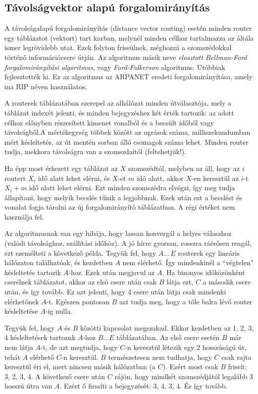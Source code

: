 \documentclass[fleqn,10pt,a4paper]{article}
\theoremstyle{magyar}
\begin{document}
  \subsection{Távolságvektor alapú forgalomirányítás}
  A távolságalapú forgalomirányítás (distance vector routing) esetén minden router egy táblázatot (vektort) tart karban,
  melynél minden célhoz tartalmazza az áltála ismer legrövidebb utat. Ezek folyton frissülnek, méghozzá a szomszédokkal
  történő információcsere útján. Az algoritmus másik neve \emph{elosztott Bellman-Ford forgalomirányítási algoritmus},
  vagy \emph{Ford-Fulkerson} algoritmus. Utóbbiak fejlesztették ki. Ez az algoritmus az ARPANET eredeti
  forgalomirányítása, amely ma RIP néven használatos.
  
  A routerek táblázatában szerepel az alhálózat minden útválasztója, mely a táblázat indexét jelenti, és minden
  bejegyzéshez két érték tartozik: az adott célhoz előnyben részesített kimenet vonalból és a becsült időből vagy
  távolságből.A mértékegység többek között az ugrások száma, milliszekundumban mért késleltetés, az út mentén sorban álló
  csomagok száma lehet. Minden router tudja, mekkora távolságra van a szomszdaitól (feltehetjük!).
  
  Ha épp most érkezett egy táblázat az $X$ szomszédtól, melyben az áll, hogy az $i$ routert $X_i$ idő alatt lehet
  elérni, és $X$-et $m$ idő alatt, akkor $X$-en keresztül az $i$-t $X_i + m$ idő alatt lehet elérni. Ezt minden
  szomszédra elvégzi, így meg tudja állapítani, hogy melyik becslés tűnik a legjobbnak. Ezek után ezt a becslést és
  vonalat fogja tárolni az új forgalomirányító táblázatban. A régi értéket nem használja fel.

  Az algoritmusnak van egy hibája, hogy lassan konvergál a helyes válaszhoz (valódi távolsághoz, szállítási időhöz). A
  jó hírre gyorsan, rosszra ráérősen reagál, ezt személteti a következő példa. Tegyük fel, hogy $A\ldots\, E$  routerek
  egy lineáris hálózaton találhatóak, és kezdetben $A$ nem elérhető. Így mindenkinél a ``végtelen'' késleltetés tartozik
  $A$-hoz. Ezek után megjavul az $A$. Ha bizonyos időközönként cserélnek táblázatot, akkor az első csere után csak $B$
  látja ezt, $C$ a második csere után, és így tovább. Ez azt jelenti, hogy 4 csere után látja csak mindenki elérhetőnek
  $A$-t. Egészen pontosan $B$ azt tudja meg, hogy a tőle balra lévő router késleltetése $A$-ig nulla.
  
  Tegyük fel, hogy $A$ és $B$ közötti kapcsolat megszakad. Ekkor kezdetben az 1, 2, 3, 4 késleltetések tartoznk $A$-hoz
  $B\ldots E$ táblázatában. Az első csere esetén $B$ már nem látja $A$-t, de azt megtudja, hogy $C$-n keresztül létezik
  egy 2 hosszúságú út, tehát $A$ elérhető $C$-n keresztül. $B$ természetesen nem tudhatja, hogy $C$ csak rajta keresztül
  éri el, mert nincsen másik hálózatban (a $C$). Ezért most csak $B$ frissít: 3, 2, 3, 4. A következő csere után $C$
  rájön, hogy mindkét szomszédjától legalább 3 hosszú útra van $A$. Ezért ő firssíti a bejegyzését: 3, 4, 3, 4. És így
  tovább. 
\end{document}
